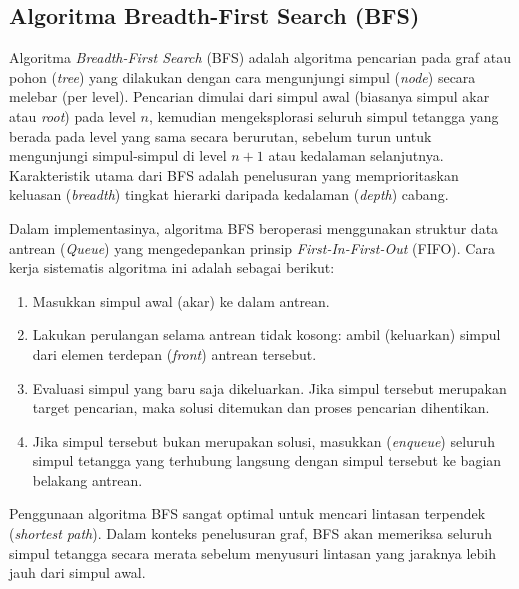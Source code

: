 \documentclass[12pt]{article}
\begin{document}
\subsection{Algoritma Breadth-First Search (BFS)}

Algoritma \textit{Breadth-First Search} (BFS) adalah algoritma pencarian pada graf atau pohon (\textit{tree}) yang dilakukan dengan cara mengunjungi simpul (\textit{node}) secara melebar (per level). Pencarian dimulai dari simpul awal (biasanya simpul akar atau \textit{root}) pada level $n$, kemudian mengeksplorasi seluruh simpul tetangga yang berada pada level yang sama secara berurutan, sebelum turun untuk mengunjungi simpul-simpul di level $n+1$ atau kedalaman selanjutnya. Karakteristik utama dari BFS adalah penelusuran yang memprioritaskan keluasan (\textit{breadth}) tingkat hierarki daripada kedalaman (\textit{depth}) cabang.

Dalam implementasinya, algoritma BFS beroperasi menggunakan struktur data antrean (\textit{Queue}) yang mengedepankan prinsip \textit{First-In-First-Out} (FIFO). Cara kerja sistematis algoritma ini adalah sebagai berikut:
\begin{enumerate}
    \item Masukkan simpul awal (akar) ke dalam antrean.
    \item Lakukan perulangan selama antrean tidak kosong: ambil (keluarkan) simpul dari elemen terdepan (\textit{front}) antrean tersebut.
    \item Evaluasi simpul yang baru saja dikeluarkan. Jika simpul tersebut merupakan target pencarian, maka solusi ditemukan dan proses pencarian dihentikan.
    \item Jika simpul tersebut bukan merupakan solusi, masukkan (\textit{enqueue}) seluruh simpul tetangga yang terhubung langsung dengan simpul tersebut ke bagian belakang antrean.
\end{enumerate}

Penggunaan algoritma BFS sangat optimal untuk mencari lintasan terpendek (\textit{shortest path}). Dalam konteks penelusuran graf, BFS akan memeriksa seluruh simpul tetangga secara merata sebelum menyusuri lintasan yang jaraknya lebih jauh dari simpul awal.
\end{document}
